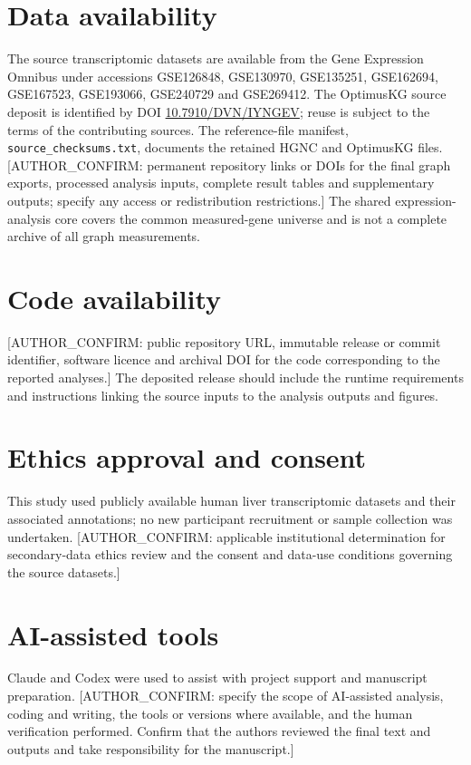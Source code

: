 \documentclass[11pt,a4paper]{article}
\begin{document}
\section*{Data availability}
The source transcriptomic datasets are available from the Gene Expression Omnibus under accessions GSE126848, GSE130970, GSE135251, GSE162694, GSE167523, GSE193066, GSE240729 and GSE269412. The OptimusKG source deposit is identified by DOI \href{https://doi.org/10.7910/DVN/IYNGEV}{10.7910/DVN/IYNGEV}; reuse is subject to the terms of the contributing sources. The reference-file manifest, \nolinkurl{source_checksums.txt}, documents the retained HGNC and OptimusKG files. [AUTHOR\_CONFIRM: permanent repository links or DOIs for the final graph exports, processed analysis inputs, complete result tables and supplementary outputs; specify any access or redistribution restrictions.] The shared expression-analysis core covers the common measured-gene universe and is not a complete archive of all graph measurements.

\section*{Code availability}
[AUTHOR\_CONFIRM: public repository URL, immutable release or commit identifier, software licence and archival DOI for the code corresponding to the reported analyses.] The deposited release should include the runtime requirements and instructions linking the source inputs to the analysis outputs and figures.

\section*{Ethics approval and consent}
This study used publicly available human liver transcriptomic datasets and their associated annotations; no new participant recruitment or sample collection was undertaken. [AUTHOR\_CONFIRM: applicable institutional determination for secondary-data ethics review and the consent and data-use conditions governing the source datasets.]

\section*{AI-assisted tools}
Claude and Codex were used to assist with project support and manuscript preparation. [AUTHOR\_CONFIRM: specify the scope of AI-assisted analysis, coding and writing, the tools or versions where available, and the human verification performed. Confirm that the authors reviewed the final text and outputs and take responsibility for the manuscript.]
\end{document}

